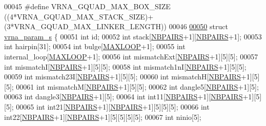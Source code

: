 \begin{DoxyCode}
00045 \textcolor{preprocessor}{#define   VRNA\_GQUAD\_MAX\_BOX\_SIZE       ((4*VRNA\_GQUAD\_MAX\_STACK\_SIZE)+(3*VRNA\_GQUAD\_MAX\_LINKER\_LENGTH))}
00046 
\hypertarget{params_8h_source.tex_l00050}{}\hyperlink{group__energy__parameters}{00050} \textcolor{keyword}{struct }\hyperlink{group__energy__parameters_structvrna__param__s}{vrna\_param\_s} \{
00051   \textcolor{keywordtype}{int}     id;
00052   \textcolor{keywordtype}{int}     stack[\hyperlink{energy__const_8h_a5e75221c779d618eab81e096f37e32ce}{NBPAIRS}+1][\hyperlink{energy__const_8h_a5e75221c779d618eab81e096f37e32ce}{NBPAIRS}+1];
00053   \textcolor{keywordtype}{int}     hairpin[31];
00054   \textcolor{keywordtype}{int}     bulge[\hyperlink{energy__const_8h_ad1bd6eabac419670ddd3c9ed82145988}{MAXLOOP}+1];
00055   \textcolor{keywordtype}{int}     internal\_loop[\hyperlink{energy__const_8h_ad1bd6eabac419670ddd3c9ed82145988}{MAXLOOP}+1];
00056   \textcolor{keywordtype}{int}     mismatchExt[\hyperlink{energy__const_8h_a5e75221c779d618eab81e096f37e32ce}{NBPAIRS}+1][5][5];
00057   \textcolor{keywordtype}{int}     mismatchI[\hyperlink{energy__const_8h_a5e75221c779d618eab81e096f37e32ce}{NBPAIRS}+1][5][5];
00058   \textcolor{keywordtype}{int}     mismatch1nI[\hyperlink{energy__const_8h_a5e75221c779d618eab81e096f37e32ce}{NBPAIRS}+1][5][5];
00059   \textcolor{keywordtype}{int}     mismatch23I[\hyperlink{energy__const_8h_a5e75221c779d618eab81e096f37e32ce}{NBPAIRS}+1][5][5];
00060   \textcolor{keywordtype}{int}     mismatchH[\hyperlink{energy__const_8h_a5e75221c779d618eab81e096f37e32ce}{NBPAIRS}+1][5][5];
00061   \textcolor{keywordtype}{int}     mismatchM[\hyperlink{energy__const_8h_a5e75221c779d618eab81e096f37e32ce}{NBPAIRS}+1][5][5];
00062   \textcolor{keywordtype}{int}     dangle5[\hyperlink{energy__const_8h_a5e75221c779d618eab81e096f37e32ce}{NBPAIRS}+1][5];
00063   \textcolor{keywordtype}{int}     dangle3[\hyperlink{energy__const_8h_a5e75221c779d618eab81e096f37e32ce}{NBPAIRS}+1][5];
00064   \textcolor{keywordtype}{int}     int11[\hyperlink{energy__const_8h_a5e75221c779d618eab81e096f37e32ce}{NBPAIRS}+1][\hyperlink{energy__const_8h_a5e75221c779d618eab81e096f37e32ce}{NBPAIRS}+1][5][5];
00065   \textcolor{keywordtype}{int}     int21[\hyperlink{energy__const_8h_a5e75221c779d618eab81e096f37e32ce}{NBPAIRS}+1][\hyperlink{energy__const_8h_a5e75221c779d618eab81e096f37e32ce}{NBPAIRS}+1][5][5][5];
00066   \textcolor{keywordtype}{int}     int22[\hyperlink{energy__const_8h_a5e75221c779d618eab81e096f37e32ce}{NBPAIRS}+1][\hyperlink{energy__const_8h_a5e75221c779d618eab81e096f37e32ce}{NBPAIRS}+1][5][5][5][5];
00067   \textcolor{keywordtype}{int}     ninio[5];

\end{DoxyCode}
